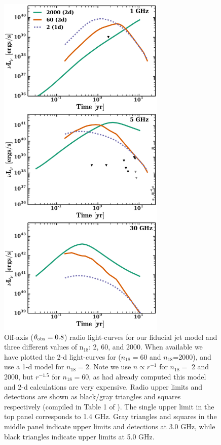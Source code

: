 \documentclass[usenatbib,fleqn]{mnras}
\begin{document}
\begin{figure} 
  \includegraphics[width=8cm]{lightcurves.pdf}
  \caption{\label{fig:upper_limits} Off-axis ($\theta_{\rm obs}=0.8$)
    radio light-curves for our fiducial jet model and three different
    values of n$_{18}$: 2, 60, and 2000. When available we have
    plotted the 2-d light-curves for ($n_{18}=60$ and $n_{18}$=2000),
    and use a 1-d model for $n_{18}=2$. Note we use $n\propto r^{-1}$
    for $n_{18}=$ 2 and 2000, but $r^{-1.5}$ for $n_{18}=60$, as
    \citet{Mimica+2015} had already computed this model and 2-d
    calculations are very expensive.  Radio upper limits and
    detections are shown as black/gray triangles and squares
    respectively (compiled in Table 1 of \citealt{Mimica+2015}). The
    single upper limit in the top panel corresponds to 1.4 GHz. Gray
    triangles and squares in the middle panel indicate upper limits
    and detections at 3.0 GHz, while black triangles indicate upper
    limits at 5.0 GHz.}
\end{figure}
\end{document}
